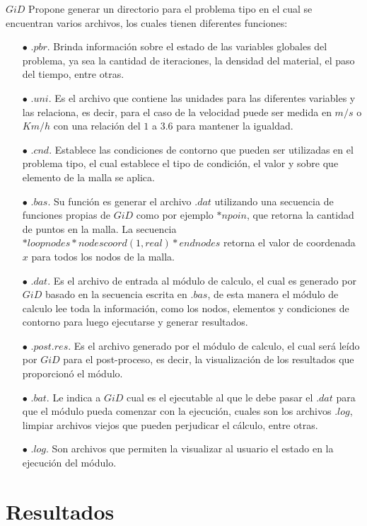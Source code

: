 \documentclass[a4paper,10pt, oneside]{book}
\begin{document}
$GiD$ Propone generar un directorio para el problema tipo en el cual se encuentran varios archivos, los cuales tienen diferentes funciones:
\begin{itemize}
  \item[$\bullet$] $.pbr$. Brinda información sobre el estado de las variables globales del problema, ya sea la cantidad de 	iteraciones, la densidad del material, el paso del tiempo, entre otras.	
  \item[$\bullet$] $.uni$. Es el archivo que contiene las unidades para las diferentes variables y las relaciona, es decir, para el caso de la velocidad puede ser medida en $m/s$ o $Km/h$ con una relación del $1$ a $3.6$ para mantener la igualdad.
  \item[$\bullet$] $.cnd$. Establece las condiciones de contorno que pueden ser utilizadas en el problema tipo, el cual establece el tipo de condición, el valor y sobre que elemento de la malla se aplica.
  \item[$\bullet$] $.bas$. Su función es generar el archivo $.dat$ utilizando una secuencia de funciones propias de $GiD$ como por ejemplo $*npoin$, que retorna la cantidad de puntos en la malla. La secuencia $*loop nodes *nodes coord(1,real) *end nodes$ retorna el valor de coordenada $x$ para todos los nodos de la malla.
  \item[$\bullet$] $.dat$. Es el archivo de entrada al módulo de calculo, el cual es generado por $GiD$ basado en la secuencia escrita en $.bas$, de esta manera el módulo de calculo lee toda la información, como los nodos, elementos y condiciones de contorno para luego ejecutarse y generar resultados.
  \item[$\bullet$] $.post.res$. Es el archivo generado por el módulo de calculo, el cual será leído por $GiD$ para el post-proceso, es decir, la visualización de los resultados que proporcionó el módulo.
  \item[$\bullet$] $.bat$. Le indica a $GiD$ cual es el ejecutable al que le debe pasar el $.dat$ para que el módulo pueda comenzar con la ejecución, cuales son los archivos $.log$, limpiar archivos viejos que pueden perjudicar el cálculo, entre otras.
  \item[$\bullet$] $.log$. Son archivos que permiten la visualizar al usuario el estado en la ejecución del módulo.
\end{itemize}

\chapter{Resultados}
\end{document}
